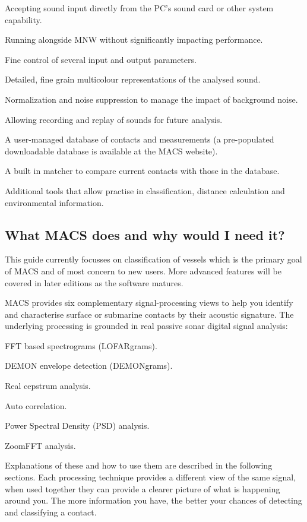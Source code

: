 \begin{compactitem}
	\item Accepting sound input directly from the PC's sound card or other system capability.
	\item Running alongside MNW without significantly impacting performance.
	\item Fine control of several input and output parameters.
	\item Detailed, fine grain multicolour representations of the analysed sound.
	\item Normalization and noise suppression to manage the impact of background noise.
	\item Allowing recording and replay of sounds for future analysis.
	\item A user-managed database of contacts and measurements (a pre-populated downloadable database is available at the MACS website).
	\item A built in matcher to compare current contacts with those in the database.
	\item Additional tools that allow practise in classification, distance calculation and environmental information.
\end{compactitem}

\subsection{What MACS does and why would I need it?}

\begin{advisory}
	This guide currently focusses on classification of vessels which is the primary goal of MACS and of most concern to new users. More advanced features will be covered in later editions as the software matures.
\end{advisory}

MACS provides six complementary signal-processing views to help you identify and characterise surface or submarine contacts by their acoustic signature. The underlying processing is grounded in real passive sonar digital signal analysis: 

\begin{compactitem}
	\item FFT based spectrograms (LOFARgrams).
	\item DEMON envelope detection (DEMONgrams).
	\item Real cepstrum analysis.
	\item Auto correlation.
	\item Power Spectral Density (PSD) analysis.
	\item ZoomFFT analysis.
\end{compactitem}

Explanations of these and how to use them are described in the following sections. Each processing technique provides a different view of the same signal, when used together they can provide a clearer picture of what is happening around you. The more information you have, the better your chances of detecting and classifying a contact.

\pagebreak